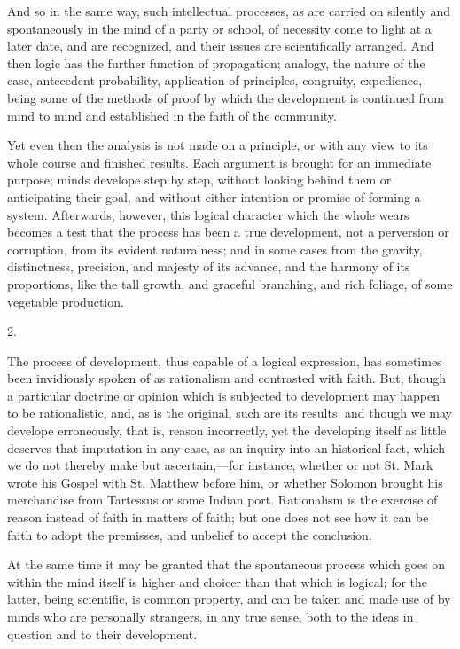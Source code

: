 And so in the same way, such intellectual processes,
as are carried on silently and spontaneously in the mind
of a party or school, of necessity come to light at a
later date, and are recognized, and their issues are
scientifically arranged. And then logic has the further
function of propagation; analogy, the nature of the case,
antecedent probability, application of principles,
congruity, expedience, being some of the methods of proof
by which the development is continued from mind to mind
and established in the faith of the community.

Yet even then the analysis is not made on a principle,
or with any view to its whole course and finished
results. Each argument is brought for an immediate
purpose; minds develope step by step, without looking
behind them or anticipating their goal, and without
either intention or promise of forming a system.
Afterwards, however, this logical character which the
whole wears becomes a test that the process has been a
true development, not a perversion or corruption, from
its evident naturalness; and in some cases from the
gravity, distinctness, precision, and majesty of its
advance, and the harmony of its proportions, like the
tall growth, and graceful branching, and rich foliage, of
some vegetable production.

2.

The process of development, thus capable of a logical
expression, has sometimes been invidiously spoken of as
rationalism and contrasted with faith. But, though a
particular doctrine or opinion which is subjected to
development may happen to be rationalistic, and, as is
the original, such are its results: and though we may
develope erroneously, that is, reason incorrectly, yet
the developing itself as little deserves that imputation
in any case, as an inquiry into an historical fact, which
we do not thereby make but ascertain,—for instance,
whether or not St. Mark wrote his Gospel with St. Matthew
before him, or whether Solomon brought his merchandise
from Tartessus or some Indian port. Rationalism is the
exercise of reason instead of faith in matters of faith;
but one does not see how it can be faith to adopt the
premisses, and unbelief to accept the conclusion.

At the same time it may be granted that the
spontaneous process which goes on within the mind itself
is higher and choicer than that which is logical; for the
latter, being scientific, is common property, and can be
taken and made use of by minds who are personally
strangers, in any true sense, both to the ideas in
question and to their development.

